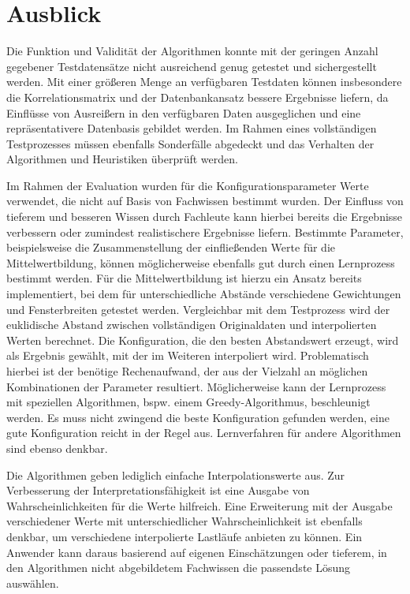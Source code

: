 
\section{Ausblick}

Die Funktion und Validität der Algorithmen konnte mit der geringen Anzahl gegebener Testdatensätze nicht ausreichend genug getestet und sichergestellt werden.
Mit einer größeren Menge an verfügbaren Testdaten können insbesondere die Korrelationsmatrix und der Datenbankansatz bessere Ergebnisse liefern, da Einflüsse von Ausreißern in den verfügbaren Daten ausgeglichen und eine repräsentativere Datenbasis gebildet werden. Im Rahmen eines vollständigen Testprozesses müssen ebenfalls Sonderfälle abgedeckt und das Verhalten der Algorithmen und Heuristiken überprüft werden.

Im Rahmen der Evaluation wurden für die Konfigurationsparameter Werte verwendet, die nicht auf Basis von Fachwissen bestimmt wurden. Der Einfluss von tieferem und besseren Wissen durch Fachleute kann hierbei bereits die Ergebnisse verbessern oder zumindest realistischere Ergebnisse liefern.
Bestimmte Parameter, beispielsweise die Zusammenstellung der einfließenden Werte für die Mittelwertbildung, können möglicherweise ebenfalls gut durch einen Lernprozess bestimmt werden. Für die Mittelwertbildung ist hierzu ein Ansatz bereits implementiert, bei dem für unterschiedliche Abstände verschiedene Gewichtungen und Fensterbreiten getestet werden. Vergleichbar mit dem Testprozess wird der euklidische Abstand zwischen vollständigen Originaldaten und interpolierten Werten berechnet. Die Konfiguration, die den besten Abstandswert erzeugt, wird als Ergebnis gewählt, mit der im Weiteren interpoliert wird. Problematisch hierbei ist der benötige Rechenaufwand, der aus der Vielzahl an möglichen Kombinationen der Parameter resultiert. Möglicherweise kann der Lernprozess mit speziellen Algorithmen, bspw. einem Greedy-Algorithmus, beschleunigt werden. Es muss nicht zwingend die beste Konfiguration gefunden werden, eine gute Konfiguration reicht in der Regel aus. Lernverfahren für andere Algorithmen sind ebenso denkbar.

Die Algorithmen geben lediglich einfache Interpolationswerte aus. Zur Verbesserung der Interpretationsfähigkeit ist eine Ausgabe von Wahrscheinlichkeiten für die Werte hilfreich. Eine Erweiterung mit der Ausgabe verschiedener Werte mit unterschiedlicher Wahrscheinlichkeit ist ebenfalls denkbar, um verschiedene interpolierte Lastläufe anbieten zu können. Ein Anwender kann daraus basierend auf eigenen Einschätzungen oder tieferem, in den Algorithmen nicht abgebildetem Fachwissen die passendste Lösung auswählen.

